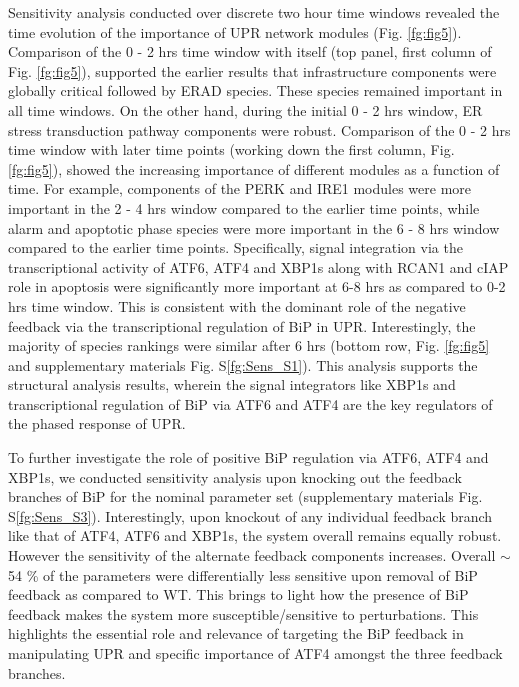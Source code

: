 \documentclass[fleqn,10pt]{wlscirep}
\begin{document}
Sensitivity analysis conducted over discrete two hour time windows revealed the time evolution of the importance of UPR network modules (Fig. \ref{fg:fig5}). Comparison of the 0 - 2 hrs time window with itself (top panel, first column of Fig. \ref{fg:fig5}), supported the earlier results that infrastructure components were globally critical followed by ERAD species. These species remained important in all time windows. On the other hand, during the initial 0 - 2 hrs window, ER stress transduction pathway components were robust. Comparison of the 0 - 2 hrs time window with later time points (working down the first column, Fig. \ref{fg:fig5}), showed the increasing importance of different modules as a function of time. For example, components of the PERK and IRE1 modules were more important in the 2 - 4 hrs window compared to the earlier time points, while alarm and apoptotic phase species were more important in the 6 - 8 hrs window compared to the earlier time points. Specifically, signal integration via the transcriptional activity of ATF6, ATF4 and XBP1s along with RCAN1 and cIAP role in apoptosis were significantly more important at 6-8 hrs as compared to 0-2 hrs time window. This is consistent with the dominant role of the negative feedback via the transcriptional regulation of BiP in UPR. Interestingly, the majority of species rankings were similar after 6 hrs (bottom row,  Fig. \ref{fg:fig5} and supplementary materials Fig. S\ref{fg:Sens_S1}). This analysis supports the structural analysis results, wherein the signal integrators like XBP1s and transcriptional regulation of BiP via ATF6 and ATF4 are the key regulators of the phased response of UPR. 

To further investigate the role of positive BiP regulation via ATF6, ATF4 and XBP1s, we conducted sensitivity analysis upon knocking out the feedback branches of BiP for the nominal parameter set (supplementary materials Fig. S\ref{fg:Sens_S3}). Interestingly, upon knockout of any individual feedback branch like that of ATF4, ATF6 and XBP1s, the system overall remains equally robust. However the sensitivity of the alternate feedback components increases. Overall $\sim$ 54 \% of the parameters were differentially less sensitive upon removal of BiP feedback as compared to WT. This brings to light how the presence of BiP feedback makes the system more susceptible/sensitive to perturbations. This highlights the essential role and relevance of targeting the BiP feedback in manipulating UPR and  specific importance of ATF4 amongst the three feedback branches.
\end{document}
